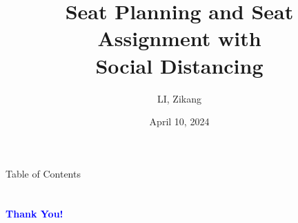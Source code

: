 \documentclass[aspectratio=43]{beamer}
\title{Seat Planning and Seat Assignment with \\ Social Distancing} %
\author[LI]{LI, Zikang}
\institute[HKUST]{
    IEDA%
    \\%
    The Hong Kong University of Science and Technology%
} %
\date{April 10, 2024}
\begin{document}
    \frame{\titlepage}

    \begin{frame}{Table of Contents}
        \tableofcontents
    \end{frame}
    
    
    
    
    
    
    
    
    
    

    \section{}
    \begin{frame}{}
        \centering
            \Huge\bfseries
        \textcolor{blue}{Thank You!}
    \end{frame}
\end{document}
